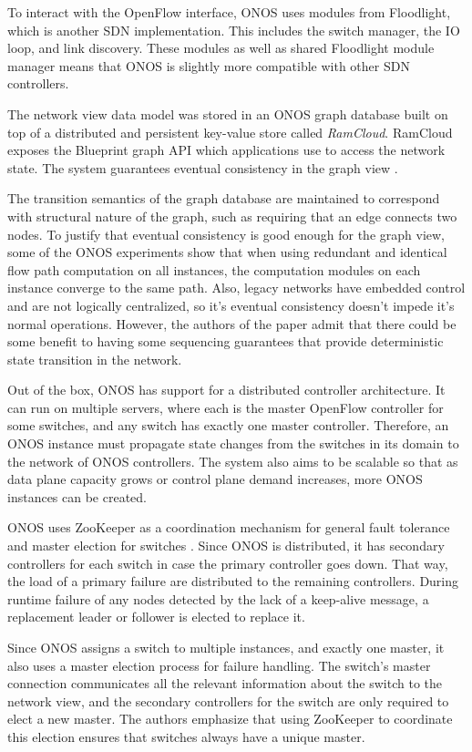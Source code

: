 \documentclass[letterpaper,twocolumn,10pt]{article}
\begin{document}
To interact with the OpenFlow interface, ONOS uses modules from Floodlight, which is another SDN implementation. This includes the switch manager, the IO loop, and link discovery. These modules as well as shared Floodlight module manager means that ONOS is slightly more compatible with other SDN controllers.

The network view data model was stored in an ONOS graph database built on top of a distributed and persistent key-value store called \emph{RamCloud}. RamCloud exposes the Blueprint graph API which applications use to access the network state. The system guarantees eventual consistency in the graph view \cite{berde2014onos}.

The transition semantics of the graph database are maintained to correspond with structural nature of the graph, such as requiring that an edge connects two nodes. To justify that eventual consistency is good enough for the graph view, some of the ONOS experiments show that when using redundant and identical flow path computation on all instances, the computation modules on each instance converge to the same path. Also, legacy networks have embedded control and are not logically centralized, so it's eventual consistency doesn't impede it's normal operations. However, the authors of the paper admit that there could be some benefit to having some sequencing guarantees that provide deterministic state transition in the network.

Out of the box, ONOS has support for a distributed controller architecture. It can run on multiple servers, where each is the master OpenFlow controller for some switches, and any switch has exactly one master controller. Therefore, an ONOS instance must propagate state changes from the switches in its domain to the network of ONOS controllers. The system also aims to be scalable so that as data plane capacity grows or control plane demand increases, more ONOS instances can be created.

ONOS uses ZooKeeper as a coordination mechanism for general fault tolerance and master election for switches \cite{hunt2010zookeeper}. Since ONOS is distributed, it has secondary controllers for each switch in case the primary controller goes down. That way, the load of a primary failure are distributed to the remaining controllers. During runtime failure of any nodes detected by the lack of a keep-alive message, a replacement leader or follower is elected to replace it.

Since ONOS assigns a switch to multiple instances, and exactly one master, it also uses a master election process for failure handling. The switch's master connection communicates all the relevant information about the switch to the network view, and the secondary controllers for the switch are only required to elect a new master. The authors emphasize that using ZooKeeper to coordinate this election ensures that switches always have a unique master. 
\end{document}
